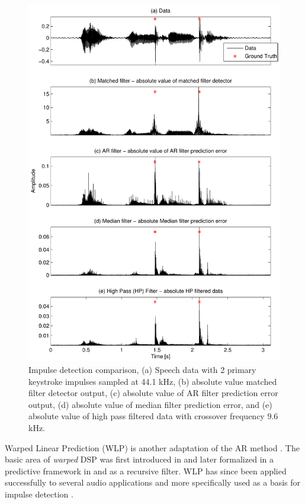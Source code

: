 \begin{figure}[!] %
\centering
\includegraphics[width=130mm]{LitRev_DetectCompare2.pdf}
\caption{Impulse detection comparison, (a) Speech data with 2 primary keystroke impulses sampled at 44.1 kHz, (b) absolute value matched filter detector output, (c) absolute value of AR filter prediction error output, (d) absolute value of median filter prediction error, and (e) absolute value of high pass filtered data with crossover frequency 9.6 kHz.}
\label{fig:LitRev_DetectCompare2}
\end{figure}

Warped Linear Prediction (WLP) is another adaptation of the AR method \cite{Esquef2002}. The basic area of \emph{warped} DSP was first introduced in \cite{Oppenheim1983} and later formalized in a predictive framework in \cite{Strube1980} and as a recursive filter\cite{Steiglitz1980}. WLP has since been applied successfully to several audio applications \cite{Karjalainen1997}\cite{Haermae2000} and more specifically used as a basis for impulse detection \cite{Esquef2000}\cite{Esquef2002}.

